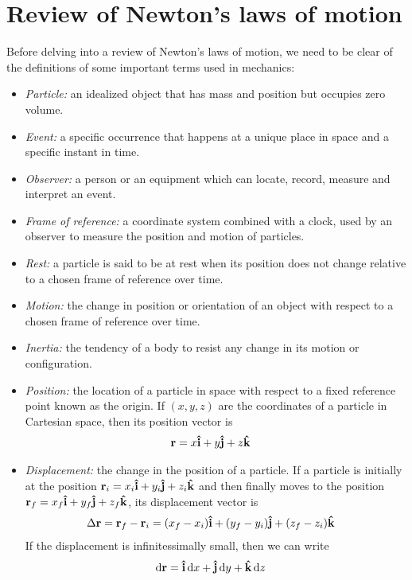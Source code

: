 \section{Review of Newton's laws of motion}
    
    Before delving into a review of Newton's laws of motion, we need to be clear of the definitions of some important terms used in mechanics:
    \begin{itemize}
    	\item \emph{Particle:} an idealized object that has mass and position but occupies zero volume.
    	
    	\item \emph{Event:} a specific occurrence that happens at a unique place in space and a specific instant in time.
    	
    	\item \emph{Observer:} a person or an equipment which can locate, record, measure and interpret an event.
    	
    	\item \emph{Frame of reference:} a coordinate system combined with a clock, used by an observer to measure the position and motion of particles.
    	
    	\item \emph{Rest:} a particle is said to be at rest when its position does not change relative to a chosen frame of reference over time.
    	
    	\item \emph{Motion:} the change in position or orientation of an object with respect to a chosen frame of reference over time.
    	
    	\item \emph{Inertia:} the tendency of a body to resist any change in its motion or configuration.
    	
    	\item \emph{Position:} the location of a particle in space with respect to a fixed reference point known as the origin. If $(x,y,z)$ are the coordinates of a particle in Cartesian space, then its position vector is
    	\begin{align}
    		\vb{r}&=x\vu{i}+y\vu{j}+z\vu{k} \label{eqn:posn-vec}
    	\end{align}
    	
    	\item \emph{Displacement:} the change in the position of a particle. If a particle is initially at the position $\vb{r}_i=x_i\vu{i}+y_i\vu{j}+z_i\vu{k}$ and then finally moves to the position $\vb{r}_f=x_f\vu{i}+y_f\vu{j}+z_f\vu{k}$, its displacement vector is
    	\begin{align}
    		\Delta\vb{r}&=\vb{r}_f-\vb{r}_i=(x_f-x_i)\vu{i}+(y_f-y_i)\vu{j}+(z_f-z_i)\vu{k} \label{eqn:displ-vec}
    	\end{align}
    	If the displacement is infinitessimally small, then we can write
    	\begin{align}
    		\dd{\vb{r}}&=\vu{i}\dd{x}+\vu{j}\dd{y}+\vu{k}\dd{z} \label{eqn:displ-vec-inf}
    	\end{align}
    	

\end{itemize}
